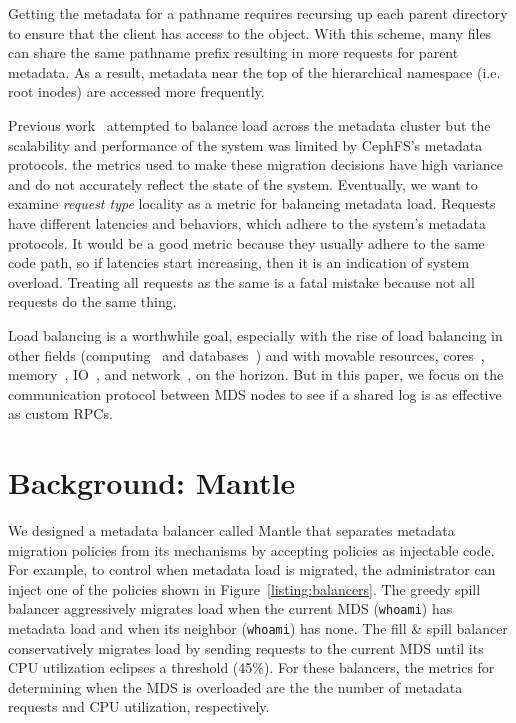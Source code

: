 \documentclass[conference]{acm_proc_article-sp} \usepackage[english]{babel}
\begin{document}
Getting the metadata for a pathname requires recursing up each parent directory
to ensure that the client has access to the object. With this scheme, many
files can share the same pathname prefix resulting in more requests for parent
metadata. As a result, metadata near the top of the hierarchical namespace
({i.e.} root inodes) are accessed more frequently. 


Previous work~\cite{sevilla:sc15-mantle} attempted to balance load across the
metadata cluster but the scalability and performance of the system was limited
by CephFS's metadata protocols. the metrics used to make these migration
decisions have high variance and do not accurately reflect the state of the
system. Eventually, we want to examine {\it request type} locality  as a metric
for balancing metadata load. Requests have different latencies and behaviors,
which adhere to the system's metadata protocols. It would be a good metric
because they usually adhere to the same code path, so if latencies start
increasing, then it is an indication of system overload. Treating all requests
as the same is a fatal mistake because not all requests do the same thing.

Load balancing is a worthwhile goal, especially with the rise of load balancing
in other fields (computing~\cite{zhang:journal2010-cloud-challenges} and
databases~\cite{elmore:sigmod2013-pythia}) and with movable resources,
cores~\cite{zhang:journal2010-cloud-challenges},
memory~\cite{chapman:atc2009-vnuma}, IO~\cite{raj:hpdc2007-io-virtualization},
and network~\cite{georgiadis:atn1996-network-qos}, on the horizon. But in this
paper, we focus on the communication protocol between MDS nodes to see if a
shared log is as effective as custom RPCs.

\section{Background: Mantle}
\label{motivation} 

We designed a metadata balancer called Mantle that separates metadata migration
policies from its mechanisms by accepting policies as injectable code. For
example, to control when metadata load is migrated, the administrator can
inject one of the policies shown in Figure~\ref{listing:balancers}. The greedy
spill balancer aggressively migrates load when the current MDS
(\texttt{whoami}) has  metadata load and when its neighbor (\texttt{whoami})
has none. The fill \& spill balancer conservatively migrates load by sending
requests to the current MDS until its CPU utilization eclipses a threshold
(45\%). For these balancers, the metrics for determining when the MDS is
overloaded are the the number of metadata requests and CPU utilization,
respectively.
\end{document}
